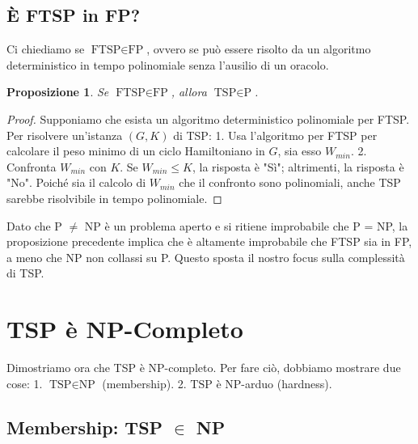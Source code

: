 \documentclass[a4paper]{article}
\newtheorem{proposition}{Proposizione}
\begin{document}
\subsection{È FTSP in FP?}

Ci chiediamo se $\text{FTSP} \in \text{FP}$, ovvero se può essere risolto da un algoritmo deterministico in tempo polinomiale senza l'ausilio di un oracolo.

\begin{proposition}
Se $\text{FTSP} \in \text{FP}$, allora $\text{TSP} \in \text{P}$.
\end{proposition}
\begin{proof}
Supponiamo che esista un algoritmo deterministico polinomiale per FTSP. Per risolvere un'istanza $(G, K)$ di TSP:
1.  Usa l'algoritmo per FTSP per calcolare il peso minimo di un ciclo Hamiltoniano in $G$, sia esso $W_{min}$.
2.  Confronta $W_{min}$ con $K$. Se $W_{min} \le K$, la risposta è "Sì"; altrimenti, la risposta è "No".
Poiché sia il calcolo di $W_{min}$ che il confronto sono polinomiali, anche TSP sarebbe risolvibile in tempo polinomiale.
\end{proof}

Dato che P $\neq$ NP è un problema aperto e si ritiene improbabile che P = NP, la proposizione precedente implica che è altamente improbabile che FTSP sia in FP, a meno che NP non collassi su P. Questo sposta il nostro focus sulla complessità di TSP.

\section{TSP è NP-Completo}

Dimostriamo ora che TSP è NP-completo. Per fare ciò, dobbiamo mostrare due cose:
1.  $\text{TSP} \in \text{NP}$ (membership).
2.  $\text{TSP}$ è $\text{NP}$-arduo (hardness).

\subsection{Membership: TSP $\in$ NP}
\end{document}
